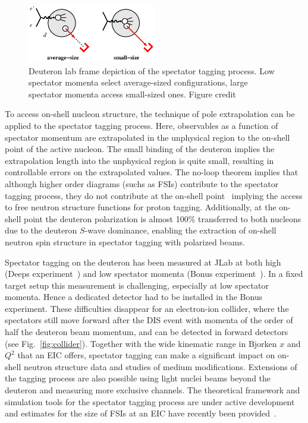    \begin{figure}
        \includegraphics[width=0.5\textwidth]{plots/deut_tag_restframe}
        \caption{Deuteron lab frame depiction of the spectator tagging process.  Low spectator momenta select average-sized configurations, large spectator momenta access small-sized ones. Figure credit~\cite{LDRD}}
        \label{fig:size}
    \end{figure}

To access on-shell nucleon structure, the technique of pole extrapolation can be applied to the spectator tagging process.  Here, observables as a function of spectator momentum are extrapolated in the unphysical region to the on-shell point of the active nucleon.  The small binding of the deuteron implies the extrapolation length into the unphysical region is quite small, resulting in controllable errors on the extrapolated values.  The no-loop theorem implies that although higher order diagrams (suchs as FSIs) contribute to the spectator tagging process, they do not contribute at the on-shell point~\cite{Sargsian:2005rm} implying the access to free neutron structure functions for proton tagging.  Additionally, at the on-shell point the deuteron polarization is almost 100\% transferred to both nucleons due to the deuteron $S$-wave dominance, enabling the extraction of on-shell neutron spin structure in spectator tagging with polarized beams.  

Spectator tagging on the deuteron has been measured at JLab at both high (Deeps experiment~\cite{Klimenko:2005zz}) and low spectator momenta (Bonus experiment~\cite{Baillie:2011za}). In a fixed target setup this measurement is challenging, especially at low spectator momenta. Hence a dedicated detector had to be installed in the Bonus experiment.  These difficulties disappear for an electron-ion collider, where the spectators still move forward after the DIS event with momenta of the order of half the deuteron beam momentum, and can be detected in forward detectors (see Fig.~\ref{fig:collider}).  Together with the wide kinematic range in Bjorken $x$ and $Q^2$ that an EIC offers, spectator tagging can make a significant impact on on-shell neutron structure data and studies of medium modifications.  Extensions of the tagging process are also possible using light nuclei beams beyond the deuteron and measuring more exclusive channels.  The theoretical framework and simulation tools for the spectator tagging process are under active development~\cite{LDRD,Guzey:2014jva,Cosyn:2016oiq} and estimates for the size of FSIs at an EIC have recently been provided~\cite{Strikman:2017koc}.

